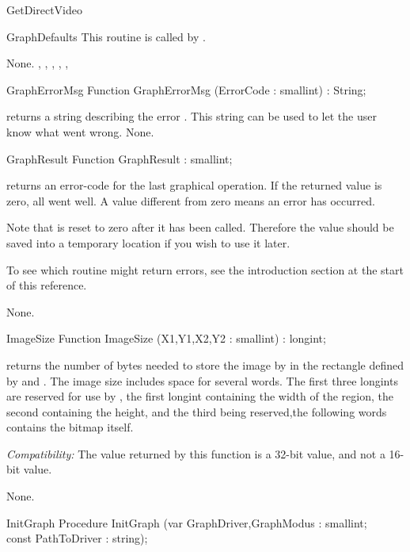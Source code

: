\begin{function}{GetDirectVideo}
\begin{procedure}{GraphDefaults}
This routine is called by .

\Errors
None.
\SeeAlso
{}, , ,
, , 
\end{procedure}

\begin{function}{GraphErrorMsg}
\Declaration
Function GraphErrorMsg (ErrorCode : smallint) : String;

\Description
{}
returns a string describing the error . This string can be
used to let the user know what went wrong.
\Errors
None.
\SeeAlso
{}
\end{function}
\begin{function}{GraphResult}
\Declaration
Function GraphResult  : smallint;

\Description
{} returns an error-code for
the last graphical operation. If the returned value is zero, all went well.
A value different from zero means an error has occurred.

Note that  is reset to zero after it has been called.
Therefore the value should be saved into a temporary location if you wish
to use it later.

To see which routine might return errors, see the introduction section at
the start of this reference.

\Errors
None.
\SeeAlso
{}
\end{function}

\begin{function}{ImageSize}
\Declaration
Function ImageSize (X1,Y1,X2,Y2 : smallint) : longint;

\Description
{} returns the number of bytes needed to store the image
by  in the rectangle defined by  and .
The image size includes space for several words. The first three longints
are reserved for use by , the first longint containing the
width of the region, the second containing the height, and the third being
reserved,the following words contains the bitmap itself.

\textit{Compatibility:}
 The value returned by this function is a 32-bit value,
 and not a 16-bit value.

\Errors
None.
\SeeAlso
{}
\end{function}

\begin{procedure}{InitGraph}
\Declaration
Procedure InitGraph (var GraphDriver,GraphModus : smallint;\\
const PathToDriver : string);


\end{procedure}
\end{function}

